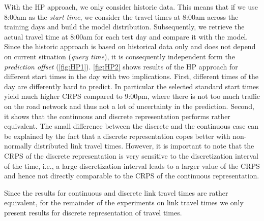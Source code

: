 With the HP approach, we only consider historic data. This means that if we use 8:00am as the \textit{start time}, we consider the travel times at 8:00am across the training days and build the model distribution. Subsequently, we retrieve the actual travel time at 8:00am for each test day and compare it with the model. Since the historic approach is based on historical data only and does not depend on current situation (\textit{query time}), it is consequently independent form the \textit{prediction offset} (\cref{fig:HP1}). \cref{fig:HP2} shows results of the HP approach for different start times in the day with two implications. First, different times of the day are differently hard to predict. In particular the selected standard start times yield much higher CRPS compared to 9:00pm, where there is not too much traffic on the road network and thus not a lot of uncertainty in the prediction.  Second, it shows that the continuous and discrete representation performs rather equivalent. The small difference between the discrete and the continuous case can be explained by the fact that a discrete representation copes better with non-normally distributed link travel times. However, it is important to note that the CRPS of the discrete representation is very sensitive to the discretization interval of the time, i.e., a large discretization interval leads to a larger value of the CRPS and hence not directly comparable to the CRPS of the continuous representation.

Since the results for continuous and discrete link travel times are rather equivalent, for the remainder of the experiments on link travel times we only present results for discrete representation of travel times.


